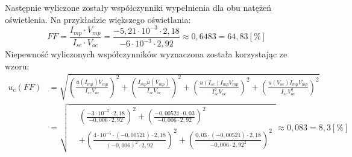 \documentclass[polish, 11pt, a4paper]{article}
\begin{document}
		Następnie wyliczone zostały współczynniki wypełnienia dla obu natężeń oświetlenia. Na przykładzie większego oświetlania:
		\begin{displaymath}
			FF = \frac{I_{mp}\cdot V_{mp}}{I_{sc}\cdot V_{oc}} = \frac{-5,21\cdot 10^{-3}\cdot 2,18}{-6\cdot 10^{-3}\cdot 2,92} \approx 0,6483 = 64,83[\%]
		\end{displaymath}
		Niepewność wyliczonych współczynników wyznaczona została korzystając ze wzoru:
		\begin{align*}
			u_c(FF) &= \sqrt{\left(\frac{u(I_{mp}) V_{mp}}{I_{sc} V_{oc}}\right)^2
						+\left(\frac{I_{mp} u(V_{mp})}{I_{sc} V_{oc}}\right)^2
						+\left(\frac{u(I_{sc}) I_{mp} V_{mp}}{I_{sc}^2 V_{oc}}\right)^2
						+\left(\frac{u(V_{oc}) I_{mp} V_{mp}}{I_{sc} V_{oc}^2}\right)^2} \\[10pt]
					&=\sqrt{
						\begin{aligned}
						&\left(\frac{-3\cdot 10^{-5}\cdot 2,18}{-0,006\cdot 2,92}\right)^2
							+\left(\frac{-0,00521\cdot 0,03}{-0,006\cdot 2,92}\right)^2\\
						&+\left(\frac{4\cdot 10^{-5}\cdot (-0,00521)\cdot 2,18}{(-0,006)^2\cdot 2,92}\right)^2
							+\left(\frac{0,03\cdot (-0,00521)\cdot 2,18}{-0,006\cdot 2,92^2}\right)^2 
						\end{aligned}
					}
					\approx 0,083 = 8,3[\%]		
		\end{align*}
\end{document}
